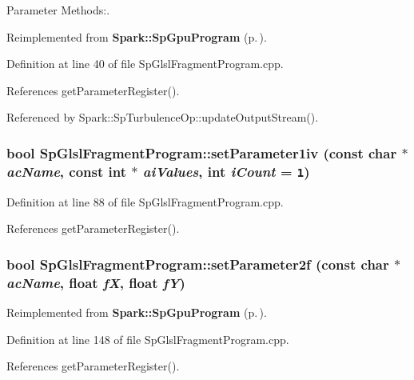 Parameter Methods:. 



Reimplemented from {\bf Spark::Sp\-Gpu\-Program} {\rm (p.\,\pageref{classSpark_1_1SpGpuProgram_a12})}.

Definition at line 40 of file Sp\-Glsl\-Fragment\-Program.cpp.

References get\-Parameter\-Register().

Referenced by Spark::Sp\-Turbulence\-Op::update\-Output\-Stream().
\subsubsection{\setlength{\rightskip}{0pt plus 5cm}bool Sp\-Glsl\-Fragment\-Program::set\-Parameter1iv (const char $\ast$ {\em ac\-Name}, const int $\ast$ {\em ai\-Values}, int {\em i\-Count} = {\tt 1})\hspace{0.3cm}{\tt  [virtual]}}\label{classSpark_1_1SpGlslFragmentProgram_a5}


Definition at line 88 of file Sp\-Glsl\-Fragment\-Program.cpp.

References get\-Parameter\-Register().
\subsubsection{\setlength{\rightskip}{0pt plus 5cm}bool Sp\-Glsl\-Fragment\-Program::set\-Parameter2f (const char $\ast$ {\em ac\-Name}, float {\em f\-X}, float {\em f\-Y})\hspace{0.3cm}{\tt  [virtual]}}\label{classSpark_1_1SpGlslFragmentProgram_a10}




Reimplemented from {\bf Spark::Sp\-Gpu\-Program} {\rm (p.\,\pageref{classSpark_1_1SpGpuProgram_a21})}.

Definition at line 148 of file Sp\-Glsl\-Fragment\-Program.cpp.

References get\-Parameter\-Register().
